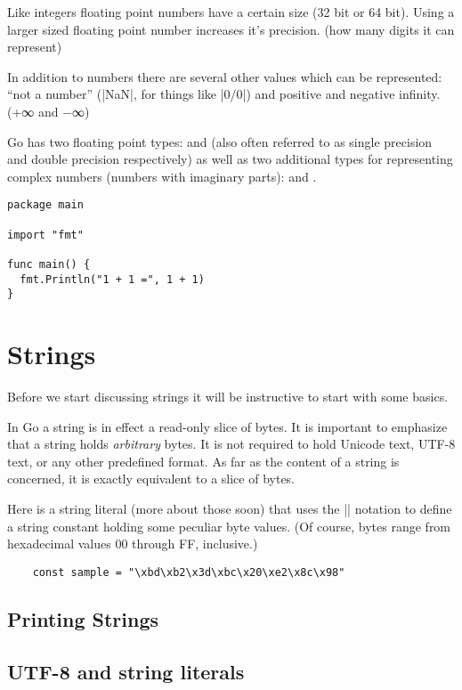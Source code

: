 Like integers floating point numbers have a certain size (32 bit or 64 bit). Using a larger sized floating point number increases it's precision. (how many digits it can represent)

In addition to numbers there are several other values which can be represented: “not a number” (|NaN|, for things like |0/0|) and positive and negative infinity. (+∞ and −∞)

Go has two floating point types:  and  (also often referred to as single precision and double precision respectively) as well as two additional types for representing complex numbers (numbers with imaginary parts):  and . 

\begin{verbatim}
package main

import "fmt"

func main() {
  fmt.Println("1 + 1 =", 1 + 1)
}
\end{verbatim}

\section{Strings}

Before we start discussing strings it will be instructive to start with some basics.

In Go a string is in effect a read-only slice of bytes. It is important to emphasize
that a string holds \textit{arbitrary} bytes. It is not required to hold Unicode text,
UTF-8 text, or any other predefined format. As far as the content of a string is concerned,
it is exactly equivalent to a slice of bytes.

Here is a string literal (more about those soon) that uses the |\xNN| notation to define a string constant holding some peculiar byte values. (Of course, bytes range from hexadecimal values 00 through FF, inclusive.)

\begin{lstlisting}
    const sample = "\xbd\xb2\x3d\xbc\x20\xe2\x8c\x98"
\end{lstlisting}

\subsection{Printing Strings}

\subsection{UTF-8 and string literals}

